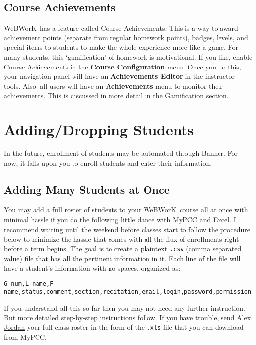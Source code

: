 \documentclass[12pt]{article}
\newcommand{\menu}[1]{\textbf{#1}}
\newcommand{\WW}{WeBWorK}
\begin{document}
\subsection{Course Achievements}

\WW\ has a feature called Course Achievements. This is a way to award achievement points (separate from regular homework points), badges, levels, and special items to students to make the whole experience more like a game. For many students, this `gamification' of homework is motivational. If you like, enable Course Achievements in the \menu{Course Configuration} menu. Once you do this, your navigation panel will have an \menu{Achievements Editor} in the instructor tools. Also, all users will have an \menu{Achievements} menu to monitor their achievements. This is discussed in more detail in the \hyperref[gamification]{Gamification} section. 

\section{Adding/Dropping Students}
In the future, enrollment of students may be automated through Banner. For now, it falls upon you to enroll students and enter their information. 

\subsection{Adding Many Students at Once}
You may add a full roster of students to your \WW\ course all at once with minimal hassle if you do the following little dance with MyPCC and Excel.  I recommend waiting until the weekend before classes start to follow the procedure below to minimize the hassle that comes with all the flux of enrollments right before a term begins. The goal is to create a plaintext \texttt{.csv} (comma separated value) file that has all the pertinent information in it.  Each line of the file will have a student's information with no spaces, organized as:\\

\small
\centerline{\texttt{G-num,L-name,F-name,status,comment,section,recitation,email,login,password,permission}}
\normalsize
\vspace{1pc}

If you understand all this so far then you may not need any further instruction. But more detailed step-by-step instructions follow. If you have trouble, send \href{mailto:alex.jordan@pcc.edu}{Alex Jordan} your full class roster in the form of the \texttt{.xls} file that you can download from MyPCC.
\end{document}
